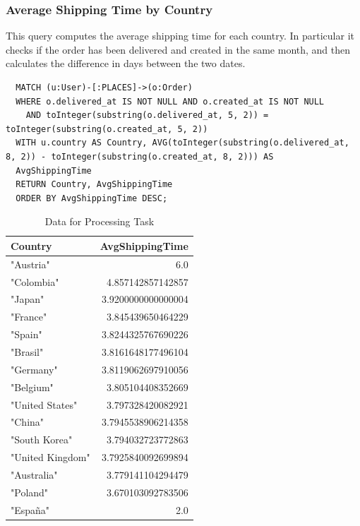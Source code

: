 \documentclass[a4paper,12pt]{article}
\begin{document}
\subsubsection{Average Shipping Time by Country}
This query computes the average shipping time for each country.
In particular it checks if the order has been delivered and created in the same month, and then calculates the difference in days between the two dates.
\begin{verbatim}
  MATCH (u:User)-[:PLACES]->(o:Order)
  WHERE o.delivered_at IS NOT NULL AND o.created_at IS NOT NULL
    AND toInteger(substring(o.delivered_at, 5, 2)) = toInteger(substring(o.created_at, 5, 2))
  WITH u.country AS Country, AVG(toInteger(substring(o.delivered_at, 8, 2)) - toInteger(substring(o.created_at, 8, 2))) AS
  AvgShippingTime
  RETURN Country, AvgShippingTime
  ORDER BY AvgShippingTime DESC;
\end{verbatim}

\begin{table}[h!]
  \centering
  \caption{Data for Processing Task}
  \label{tab:processing_data}
  \begin{tabular}{l r}
      \toprule
      \textbf{Country} & \textbf{AvgShippingTime} \\
      \midrule
      "Austria" &	6.0\\
      "Colombia" & 4.857142857142857 \\
      "Japan" & 3.9200000000000004 \\
      "France" & 3.845439650464229 \\
      "Spain" & 3.8244325767690226 \\
      "Brasil" & 3.8161648177496104 \\
      "Germany" & 3.8119062697910056 \\
      "Belgium" & 3.805104408352669 \\
      "United States" & 3.797328420082921 \\
      "China" & 3.7945538906214358 \\
      "South Korea" & 3.794032723772863 \\
      "United Kingdom" & 3.7925840092699894 \\
      "Australia" & 3.779141104294479 \\
      "Poland" & 3.670103092783506 \\
      "España" & 2.0 \\
      \bottomrule
  \end{tabular}
\end{table}
\end{document}
